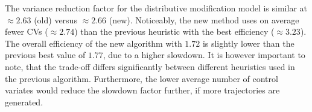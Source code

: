 The variance reduction factor for the distributive modification model is similar at $\approx 2.63$ (old) versus $\approx 2.66$ (new).
Noticeably, the new method uses on average fewer CVs ($\approx 2.74$) than the previous heuristic with the best efficiency ($\approx 3.23$).
The overall efficiency of the new algorithm with $1.72$ is slightly lower than the previous best value of $1.77$, due to a higher slowdown.
It is however important to note, that the trade-off differs significantly between different  heuristics used in the previous algorithm.
Furthermore, the lower average number of control variates would reduce the slowdown factor further, if more trajectories are generated.
